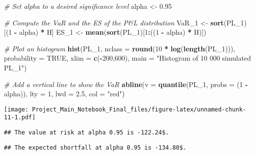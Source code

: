 \documentclass[]{article}
\newenvironment{Shaded}{\begin{snugshade}}{\end{snugshade}}
\newcommand{\CommentTok}[1]{\textcolor[rgb]{0.56,0.35,0.01}{\textit{#1}}}
\newcommand{\DataTypeTok}[1]{\textcolor[rgb]{0.13,0.29,0.53}{#1}}
\newcommand{\DecValTok}[1]{\textcolor[rgb]{0.00,0.00,0.81}{#1}}
\newcommand{\FloatTok}[1]{\textcolor[rgb]{0.00,0.00,0.81}{#1}}
\newcommand{\KeywordTok}[1]{\textcolor[rgb]{0.13,0.29,0.53}{\textbf{#1}}}
\newcommand{\NormalTok}[1]{#1}
\newcommand{\OperatorTok}[1]{\textcolor[rgb]{0.81,0.36,0.00}{\textbf{#1}}}
\newcommand{\OtherTok}[1]{\textcolor[rgb]{0.56,0.35,0.01}{#1}}
\newcommand{\StringTok}[1]{\textcolor[rgb]{0.31,0.60,0.02}{#1}}
\begin{document}
\begin{Shaded}
\begin{Highlighting}[]
\CommentTok{\# Set alpha to a desired significance level}
\NormalTok{alpha <{-}}\StringTok{ }\FloatTok{0.95}

\CommentTok{\# Compute the VaR and the ES of the P\&L distribution}
\NormalTok{VaR\_}\DecValTok{1}\NormalTok{ <{-}}\StringTok{ }\KeywordTok{sort}\NormalTok{(PL\_}\DecValTok{1}\NormalTok{)[(}\DecValTok{1} \OperatorTok{{-}}\StringTok{ }\NormalTok{alpha) }\OperatorTok{*}\StringTok{ }\NormalTok{H]}
\NormalTok{ES\_}\DecValTok{1}\NormalTok{  <{-}}\StringTok{ }\KeywordTok{mean}\NormalTok{(}\KeywordTok{sort}\NormalTok{(PL\_}\DecValTok{1}\NormalTok{)[}\DecValTok{1}\OperatorTok{:}\NormalTok{((}\DecValTok{1} \OperatorTok{{-}}\StringTok{ }\NormalTok{alpha) }\OperatorTok{*}\StringTok{ }\NormalTok{H)])}

\CommentTok{\# Plot an histogram}
\KeywordTok{hist}\NormalTok{(PL\_}\DecValTok{1}\NormalTok{, }\DataTypeTok{nclass =} \KeywordTok{round}\NormalTok{(}\DecValTok{10} \OperatorTok{*}\StringTok{ }\KeywordTok{log}\NormalTok{(}\KeywordTok{length}\NormalTok{(PL\_}\DecValTok{1}\NormalTok{))), }
           \DataTypeTok{probability =} \OtherTok{TRUE}\NormalTok{, }\DataTypeTok{xlim =} \KeywordTok{c}\NormalTok{(}\OperatorTok{{-}}\DecValTok{200}\NormalTok{,}\DecValTok{600}\NormalTok{),}
           \DataTypeTok{main =} \StringTok{"Histogram of 10 000 simulated PL\_1"}\NormalTok{)}

\CommentTok{\# Add a vertical line to show the VaR}
\KeywordTok{abline}\NormalTok{(}\DataTypeTok{v   =} \KeywordTok{quantile}\NormalTok{(PL\_}\DecValTok{1}\NormalTok{, }\DataTypeTok{probs =}\NormalTok{ (}\DecValTok{1} \OperatorTok{{-}}\StringTok{ }\NormalTok{alpha)),}
       \DataTypeTok{lty =} \DecValTok{1}\NormalTok{,}
       \DataTypeTok{lwd =} \FloatTok{2.5}\NormalTok{,}
       \DataTypeTok{col =} \StringTok{"red"}\NormalTok{)}
\end{Highlighting}
\end{Shaded}

\texttt{[image: Project\_Main\_Notebook\_Final\_files/figure-latex/unnamed-chunk-11-1.pdf]}

\begin{verbatim}
## The value at risk at alpha 0.95 is -122.24$.
\end{verbatim}

\begin{verbatim}
## The expected shortfall at alpha 0.95 is -134.80$.
\end{verbatim}
\end{document}
